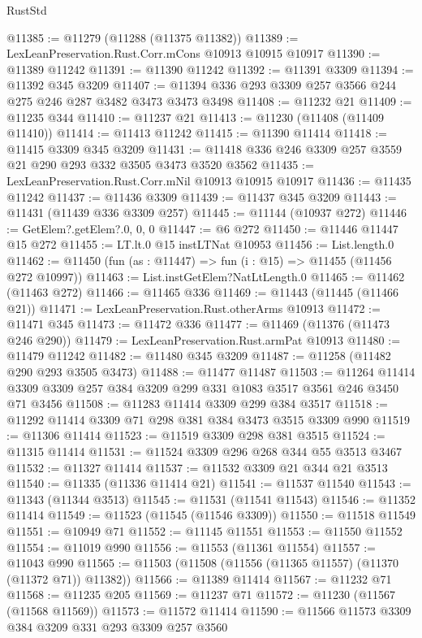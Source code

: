 \begin{lexlean}{RustStd}
\begin{coremodule}
{\begin{coremodule}
{{{{{{{{{{{{{{{{{{{{{{{{{{{{{{{{{{{{{{{{{{{{{{{{{{{{{{{{{{{{{{{{{{{{{{{{{{{{{{{{{{{{{@11385 := @11279 (@11288 (@11375 @11382))
@11389 := LexLeanPreservation.Rust.Corr.mCons @10913 @10915 @10917
@11390 := @11389 @11242
@11391 := @11390 @11242
@11392 := @11391 @3309
@11394 := @11392 @345 @3209
@11407 := @11394 @336 @293 @3309 @257 @3566 @244 @275 @246 @287 @3482 @3473 @3473 @3498
@11408 := @11232 @21
@11409 := @11235 @344
@11410 := @11237 @21
@11413 := @11230 (@11408 (@11409 @11410))
@11414 := @11413 @11242
@11415 := @11390 @11414
@11418 := @11415 @3309 @345 @3209
@11431 := @11418 @336 @246 @3309 @257 @3559 @21 @290 @293 @332 @3505 @3473 @3520 @3562
@11435 := LexLeanPreservation.Rust.Corr.mNil @10913 @10915 @10917
@11436 := @11435 @11242
@11437 := @11436 @3309
@11439 := @11437 @345 @3209
@11443 := @11431 (@11439 @336 @3309 @257)
@11445 := @11144 (@10937 @272)
@11446 := GetElem?.getElem?.{0, 0, 0}
@11447 := @6 @272
@11450 := @11446 @11447 @15 @272
@11455 := LT.lt.{0} @15 instLTNat @10953
@11456 := List.length.{0}
@11462 := @11450 (fun (as : @11447) => fun (i : @15) => @11455 (@11456 @272 @10997))
@11463 := List.instGetElem?NatLtLength.{0}
@11465 := @11462 (@11463 @272)
@11466 := @11465 @336
@11469 := @11443 (@11445 (@11466 @21))
@11471 := LexLeanPreservation.Rust.otherArms @10913
@11472 := @11471 @345
@11473 := @11472 @336
@11477 := @11469 (@11376 (@11473 @246 @290))
@11479 := LexLeanPreservation.Rust.armPat @10913
@11480 := @11479 @11242
@11482 := @11480 @345 @3209
@11487 := @11258 (@11482 @290 @293 @3505 @3473)
@11488 := @11477 @11487
@11503 := @11264 @11414 @3309 @3309 @257 @384 @3209 @299 @331 @1083 @3517 @3561 @246 @3450 @71 @3456
@11508 := @11283 @11414 @3309 @299 @384 @3517
@11518 := @11292 @11414 @3309 @71 @298 @381 @384 @3473 @3515 @3309 @990
@11519 := @11306 @11414
@11523 := @11519 @3309 @298 @381 @3515
@11524 := @11315 @11414
@11531 := @11524 @3309 @296 @268 @344 @55 @3513 @3467
@11532 := @11327 @11414
@11537 := @11532 @3309 @21 @344 @21 @3513
@11540 := @11335 (@11336 @11414 @21)
@11541 := @11537 @11540
@11543 := @11343 (@11344 @3513)
@11545 := @11531 (@11541 @11543)
@11546 := @11352 @11414
@11549 := @11523 (@11545 (@11546 @3309))
@11550 := @11518 @11549
@11551 := @10949 @71
@11552 := @11145 @11551
@11553 := @11550 @11552
@11554 := @11019 @990
@11556 := @11553 (@11361 @11554)
@11557 := @11043 @990
@11565 := @11503 (@11508 (@11556 (@11365 @11557) (@11370 (@11372 @71)) @11382))
@11566 := @11389 @11414
@11567 := @11232 @71
@11568 := @11235 @205
@11569 := @11237 @71
@11572 := @11230 (@11567 (@11568 @11569))
@11573 := @11572 @11414
@11590 := @11566
    @11573
    @3309
    @384
    @3209
    @331
    @293
    @3309
    @257
    @3560
}}}}}}}}}}}}}}}}}}}}}}}}}}}}}}}}}}}}}}}}}}}}}}}}}}}}}}}}}}}}}}}}}}}}}}}}}}}}}}}}}}}}}
\end{coremodule}}
\end{coremodule}
\end{lexlean}
